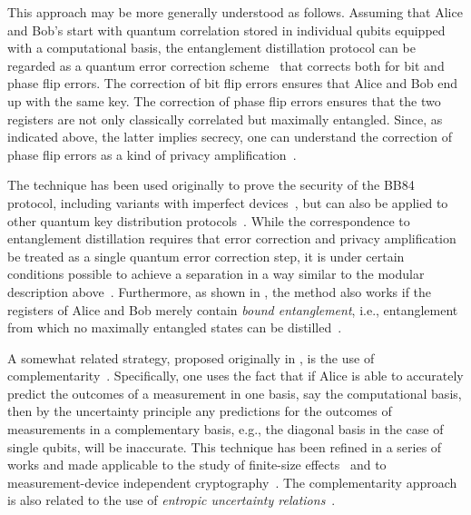 This approach may be more generally understood as follows. Assuming that Alice and Bob's start with quantum correlation stored in individual qubits equipped with a computational basis, the entanglement distillation protocol can be regarded as a quantum error correction scheme~\cite{CS96,Steane96} that corrects both for bit and phase flip errors. The correction of bit flip errors ensures that Alice and Bob end up with the same key. The correction of phase flip errors ensures that the two registers are not only classically correlated but maximally entangled. Since, as indicated above, the latter implies secrecy, one can understand the correction of phase flip errors as a kind of privacy amplification~\cite{Renes2013}.

The technique has  been used originally to prove the security of the BB84 protocol, including variants with imperfect devices~\cite{GLLP04}, but can also be applied to other quantum key distribution protocols~\cite{Tamaki03,Koashi04,Boileau}. While the correspondence to entanglement distillation requires that error correction and privacy amplification be treated as a single quantum error correction step, it is under certain conditions possible to achieve a separation in a way similar to the modular description above~\cite{Lo03}. Furthermore, as shown in \textcite{HHHLO08}, the method also works if the registers of Alice and Bob merely contain \emph{bound entanglement}, i.e., entanglement from which no maximally entangled states can be distilled~\cite{HHH98}. 

A somewhat related strategy, proposed originally in \textcite{May01}, is the use of complementarity~\cite{Koa09}. Specifically, one uses the fact that if Alice is able to accurately predict the outcomes of a measurement in one basis, say the computational basis, then by the uncertainty principle any predictions for the outcomes of measurements in a complementary basis, e.g., the diagonal basis in the case of single qubits, will be inaccurate.  This technique has been refined in a series of works and made applicable to the study of finite-size effects~\cite{HT12,TLGR12} and to measurement-device independent cryptography~\cite{TamakiLo12}. The complementarity approach is also related to the use of  \emph{entropic uncertainty relations}~\cite{Berta10,Coles,TR11}.


